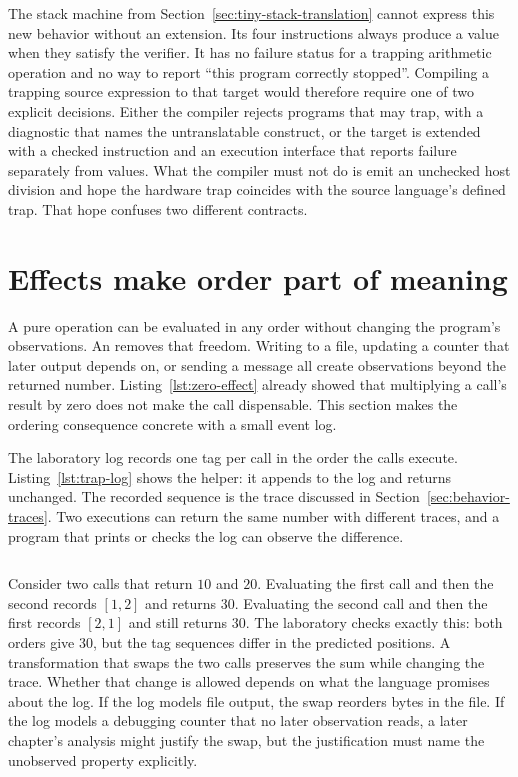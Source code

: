 The stack machine from Section~\ref{sec:tiny-stack-translation} cannot express this new behavior without an extension.
Its four instructions always produce a value when they satisfy the verifier.
It has no failure status for a trapping arithmetic operation and no way to report \enquote{this program correctly stopped}.
Compiling a trapping source expression to that target would therefore require one of two explicit decisions.
Either the compiler rejects programs that may trap, with a diagnostic that names the untranslatable construct, or the target is extended with a checked instruction and an execution interface that reports failure separately from values.
What the compiler must not do is emit an unchecked host division and hope the hardware trap coincides with the source language's defined trap.
That hope confuses two different contracts.

\section{Effects make order part of meaning}
\label{sec:trap-effects-order}

A pure operation can be evaluated in any order without changing the program's observations.
An  removes that freedom.
Writing to a file, updating a counter that later output depends on, or sending a message all create observations beyond the returned number.
Listing~\ref{lst:zero-effect} already showed that multiplying a call's result by zero does not make the call dispensable.
This section makes the ordering consequence concrete with a small event log.

The laboratory log records one tag per call in the order the calls execute.
Listing~\ref{lst:trap-log} shows the helper: it appends  to the log and returns  unchanged.
The recorded sequence is the trace discussed in Section~\ref{sec:behavior-traces}.
Two executions can return the same number with different traces, and a program that prints or checks the log can observe the difference.

\begin{listing}
  \inputminted[firstline=72,lastline=83]{c}{example-code/ch01/trap_lab.c}
  \caption{Logging preserves the value while recording the call order.}
  \label{lst:trap-log}
\end{listing}

Consider two calls that return $10$ and $20$.
Evaluating the first call and then the second records $[1,2]$ and returns $30$.
Evaluating the second call and then the first records $[2,1]$ and still returns $30$.
The laboratory checks exactly this: both orders give $30$, but the tag sequences differ in the predicted positions.
A transformation that swaps the two calls preserves the sum while changing the trace.
Whether that change is allowed depends on what the language promises about the log.
If the log models file output, the swap reorders bytes in the file.
If the log models a debugging counter that no later observation reads, a later chapter's analysis might justify the swap, but the justification must name the unobserved property explicitly.

